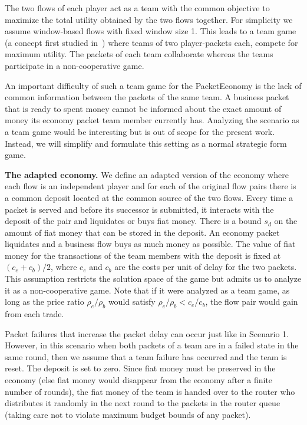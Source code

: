\documentclass[letterpaper,10pt]{llncs}
\begin{document}
The two flows of each player act as a team with the common objective to maximize the total
utility obtained by the two flows together. For simplicity we assume window-based flows with 
fixed window size 1. This leads to a team game (a concept first studied in~\cite{Palfrey:1983:Team}) 
where teams of two player-packets each, compete for maximum utility.
The packets of each team collaborate whereas the teams participate in a non-cooperative game. 

An important difficulty of such a team game for the PacketEconomy is the lack of 
common information between the packets of the same team. A business
packet that is ready to spent money cannot be informed about the exact amount 
of money its economy packet team member currently has. 
Analyzing the scenario as a team game would be interesting
but is out of scope for the present work. 
Instead, we will simplify and formulate this setting as a normal strategic form game. 

{\bf The adapted economy.} We define an adapted version of the economy where 
each flow is an independent player and for each of the original flow pairs there
is a common deposit located at the common source of the two flows. Every time a packet is served
and before its successor is submitted, it interacts with the deposit of the pair and liquidates or buys fiat money. There is a bound $s_d$ on the amount of fiat money that can be stored in the deposit.
An economy packet liquidates and a business flow buys as much money as possible. The value of fiat money for the transactions of the team members with 
the deposit is fixed at $(c_e + c_b)/2$, where $c_e$ and $c_b$ are the costs per unit
of delay for the two packets. This assumption restricts the solution space of the game
but admits us to analyze it as a non-cooperative game. Note that if it were analyzed as a team game, 
as long as the price ratio $\rho_e / \rho_b$ would satisfy $\rho_e / \rho_b < c_e/c_b$, the flow pair would gain from each trade. 

Packet failures that increase the packet delay can occur just like in Scenario 1. 
However, in this scenario when both packets of a team are in a failed state in the same round, 
then we assume that a team failure has occurred and the team is reset. The deposit is set to zero.
Since fiat money must be preserved in the economy (else fiat money would disappear from
the economy after a finite number of rounds), the fiat money of the team is handed
over to the router who distributes it randomly in the next round to the packets in the
router queue (taking care not to violate maximum budget bounds of any packet).
\end{document}
